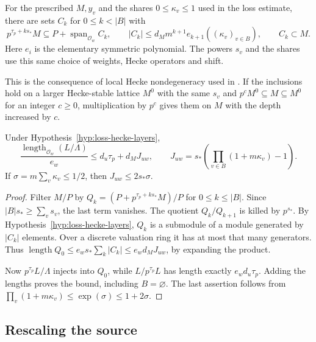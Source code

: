 \begin{hypothesis}[\openinput]\label{hyp:loss-hecke-layers}
For the prescribed $M,y_v$ and the shares $0\le\kappa_v\le1$ used
in the loss estimate, there are sets $C_k$ for $0\le k<|B|$ with
\[
 p^{\tau_p+ks_*}M\subseteq P+\operatorname{span}_{\mathcal O_w} C_k,
 \qquad |C_k|\le d_M m^{k+1} e_{k+1}((\kappa_v)_{v\in B}),\qquad C_k\subset M .
\]
Here $e_i$ is the elementary symmetric polynomial. The powers $s_v$
and the shares use this same choice of weights, Hecke operators and shift.
\end{hypothesis}

This is the consequence of local Hecke nondegeneracy used in
\citep[Proposition~12.16 and Theorem~12.18]{adriazola-grh}.
If the inclusions hold on a larger Hecke-stable lattice $M^0$ with
the same $s_v$ and $p^cM^0\subseteq M\subseteq M^0$ for an integer
$c\ge0$, multiplication by $p^c$ gives them on $M$ with the depth
increased by $c$.

\begin{proposition}\label{prop:loss-length}
Under Hypothesis~\ref{hyp:loss-hecke-layers},
\[
 \frac{\operatorname{length}_{\mathcal O_w}(L/\Lambda)}{e_w}
 \le d_u\tau_p+d_M J_{uw},\qquad
 J_{uw}=s_*\left(\prod_{v\in B}(1+m\kappa_v)-1\right).
\]
If $\sigma=m\sum_v\kappa_v\le1/2$, then $J_{uw}\le2s_*\sigma$.
\end{proposition}

\begin{proof}
Filter $M/P$ by $Q_k=(P+p^{\tau_p+ks_*}M)/P$ for $0\le k\le |B|$.
Since $|B|s_*\ge\sum_v s_v$, the last term vanishes. The quotient
$Q_k/Q_{k+1}$ is killed by $p^{s_*}$. By Hypothesis~\ref{hyp:loss-hecke-layers},
$Q_k$ is a submodule of a module generated by $|C_k|$ elements.
Over a discrete valuation ring it has at most that many generators.
Thus $\operatorname{length}Q_0\le e_ws_*\sum_k|C_k|
\le e_wd_M J_{uw}$, by expanding the product.

Now $p^{\tau_p}L/\Lambda$ injects into $Q_0$, while
$L/p^{\tau_p}L$ has length exactly $e_w d_u\tau_p$.
Adding the lengths proves the bound, including $B=\varnothing$.
The last assertion follows from
$\prod_v(1+m\kappa_v)\le\exp(\sigma)\le1+2\sigma$.
\end{proof}

\subsection{Rescaling the source}


